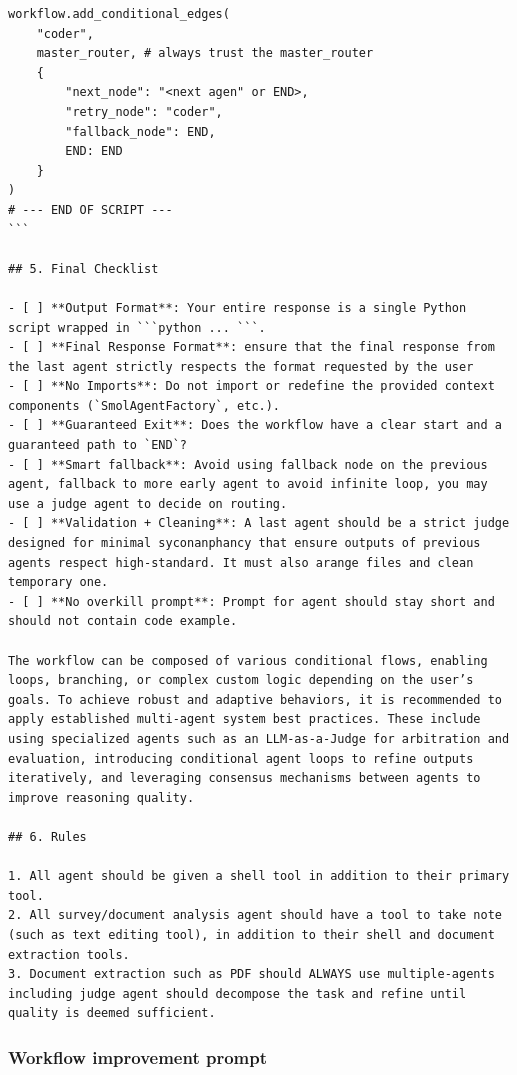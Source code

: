 \documentclass{article}
\begin{document}
\begin{verbatim}
workflow.add_conditional_edges(
    "coder",
    master_router, # always trust the master_router
    {
        "next_node": "<next agen" or END>,
        "retry_node": "coder",
        "fallback_node": END,
        END: END
    }
)
# --- END OF SCRIPT ---
```

## 5. Final Checklist

- [ ] **Output Format**: Your entire response is a single Python script wrapped in ```python ... ```.
- [ ] **Final Response Format**: ensure that the final response from the last agent strictly respects the format requested by the user
- [ ] **No Imports**: Do not import or redefine the provided context components (`SmolAgentFactory`, etc.).
- [ ] **Guaranteed Exit**: Does the workflow have a clear start and a guaranteed path to `END`?
- [ ] **Smart fallback**: Avoid using fallback node on the previous agent, fallback to more early agent to avoid infinite loop, you may use a judge agent to decide on routing.
- [ ] **Validation + Cleaning**: A last agent should be a strict judge designed for minimal syconanphancy that ensure outputs of previous agents respect high-standard. It must also arange files and clean temporary one.
- [ ] **No overkill prompt**: Prompt for agent should stay short and should not contain code example.

The workflow can be composed of various conditional flows, enabling loops, branching, or complex custom logic depending on the user’s goals. To achieve robust and adaptive behaviors, it is recommended to apply established multi-agent system best practices. These include using specialized agents such as an LLM-as-a-Judge for arbitration and evaluation, introducing conditional agent loops to refine outputs iteratively, and leveraging consensus mechanisms between agents to improve reasoning quality.

## 6. Rules

1. All agent should be given a shell tool in addition to their primary tool.
2. All survey/document analysis agent should have a tool to take note (such as text editing tool), in addition to their shell and document extraction tools.
3. Document extraction such as PDF should ALWAYS use multiple-agents including judge agent should decompose the task and refine until quality is deemed sufficient.
\end{verbatim}

\subsubsection{Workflow improvement prompt}
\end{document}
